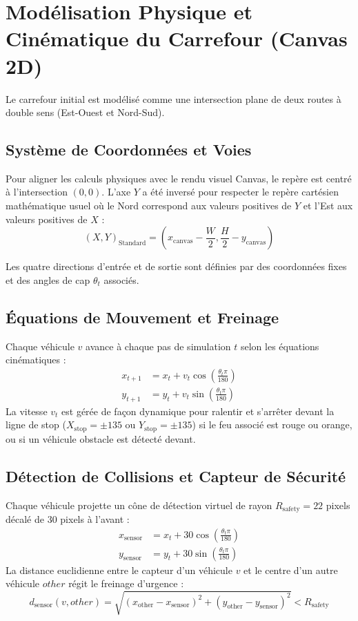 \documentclass[11pt,a4paper]{article}
\begin{document}
\section{Modélisation Physique et Cinématique du Carrefour (Canvas 2D)}
Le carrefour initial est modélisé comme une intersection plane de deux routes à double sens (Est-Ouest et Nord-Sud).

\subsection{Système de Coordonnées et Voies}
Pour aligner les calculs physiques avec le rendu visuel Canvas, le repère est centré à l'intersection $(0,0)$. L'axe $Y$ a été inversé pour respecter le repère cartésien mathématique usuel où le Nord correspond aux valeurs positives de $Y$ et l'Est aux valeurs positives de $X$ :
\begin{equation}
    (X, Y)_{\text{Standard}} = \left( x_{\text{canvas}} - \frac{W}{2}, \frac{H}{2} - y_{\text{canvas}} \right)
\end{equation}

Les quatre directions d'entrée et de sortie sont définies par des coordonnées fixes et des angles de cap $\theta_t$ associés.

\subsection{Équations de Mouvement et Freinage}
Chaque véhicule $v$ avance à chaque pas de simulation $t$ selon les équations cinématiques :
\begin{align}
    x_{t+1} &= x_t + v_t \cos\left(\frac{\theta_t \pi}{180}\right) \\
    y_{t+1} &= y_t + v_t \sin\left(\frac{\theta_t \pi}{180}\right)
\end{align}
La vitesse $v_t$ est gérée de façon dynamique pour ralentir et s'arrêter devant la ligne de stop ($X_{\text{stop}} = \pm 135$ ou $Y_{\text{stop}} = \pm 135$) si le feu associé est rouge ou orange, ou si un véhicule obstacle est détecté devant.

\subsection{Détection de Collisions et Capteur de Sécurité}
Chaque véhicule projette un cône de détection virtuel de rayon $R_{\text{safety}} = 22$ pixels décalé de 30 pixels à l'avant :
\begin{align}
    x_{\text{sensor}} &= x_t + 30 \cos\left(\frac{\theta_t \pi}{180}\right) \\
    y_{\text{sensor}} &= y_t + 30 \sin\left(\frac{\theta_t \pi}{180}\right)
\end{align}
La distance euclidienne entre le capteur d'un véhicule $v$ et le centre d'un autre véhicule $other$ régit le freinage d'urgence :
\begin{equation}
    d_{\text{sensor}}(v, other) = \sqrt{(x_{\text{other}} - x_{\text{sensor}})^2 + (y_{\text{other}} - y_{\text{sensor}})^2} < R_{\text{safety}}
\end{equation}
\end{document}
